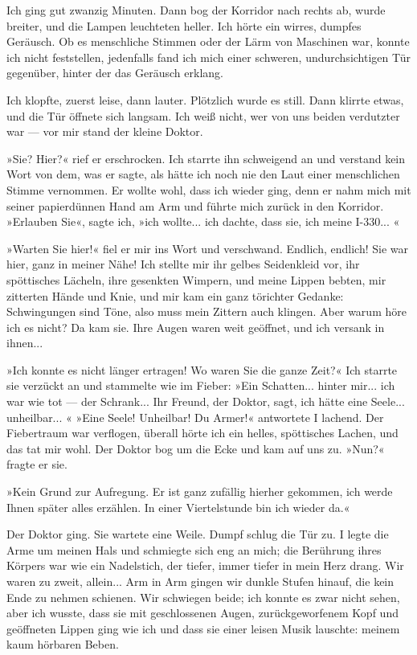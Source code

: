 Ich ging gut zwanzig Minuten. Dann bog der Korridor nach rechts ab,
wurde breiter, und die Lampen leuchteten heller. Ich hörte ein
wirres, dumpfes Geräusch. Ob es menschliche Stimmen oder der Lärm
von Maschinen war, konnte ich nicht feststellen, jedenfalls fand
ich mich einer schweren, undurchsichtigen Tür gegenüber, hinter der
das Geräusch erklang.

Ich klopfte, zuerst leise, dann lauter. Plötzlich wurde es still.
Dann klirrte etwas, und die Tür öffnete sich langsam. Ich weiß
nicht, wer von uns beiden verdutzter war — vor mir stand der kleine
Doktor.

»Sie? Hier?« rief er erschrocken. Ich starrte ihn schweigend an und
verstand kein Wort von dem, was er sagte, als hätte ich noch nie
den Laut einer menschlichen Stimme vernommen. Er wollte wohl, dass
ich wieder ging, denn er nahm mich mit seiner papierdünnen Hand am
Arm und führte mich zurück in den Korridor. »Erlauben Sie«, sagte
ich, »ich wollte... ich dachte, dass sie, ich meine I-330... «

»Warten Sie hier!« fiel er mir ins Wort und verschwand. Endlich,
endlich! Sie war hier, ganz in meiner Nähe! Ich stellte mir ihr
gelbes Seidenkleid vor, ihr spöttisches Lächeln, ihre gesenkten
Wimpern, und meine Lippen bebten, mir zitterten Hände und Knie, und
mir kam ein ganz törichter Gedanke: Schwingungen sind Töne, also
muss mein Zittern auch klingen. Aber warum höre ich es nicht? Da
kam sie. Ihre Augen waren weit geöffnet, und ich versank in
ihnen...

»Ich konnte es nicht länger ertragen! Wo waren Sie die ganze Zeit?«
Ich starrte sie verzückt an und stammelte wie im Fieber: »Ein
Schatten... hinter mir... ich war wie tot — der Schrank... Ihr
Freund, der Doktor, sagt, ich hätte eine Seele... unheilbar... «
»Eine Seele! Unheilbar! Du Armer!« antwortete I lachend. Der
Fiebertraum war verflogen, überall hörte ich ein helles,
spöttisches Lachen, und das tat mir wohl. Der Doktor bog um die
Ecke und kam auf uns zu. »Nun?« fragte er sie.

»Kein Grund zur Aufregung. Er ist ganz zufällig hierher gekommen,
ich werde Ihnen später alles erzählen. In einer Viertelstunde bin
ich wieder da.«

Der Doktor ging. Sie wartete eine Weile. Dumpf schlug die Tür zu. I
legte die Arme um meinen Hals und schmiegte sich eng an mich; die
Berührung ihres Körpers war wie ein Nadelstich, der tiefer, immer
tiefer in mein Herz drang. Wir waren zu zweit, allein... Arm in Arm
gingen wir dunkle Stufen hinauf, die kein Ende zu nehmen schienen.
Wir schwiegen beide; ich konnte es zwar nicht sehen, aber ich
wusste, dass sie mit geschlossenen Augen, zurückgeworfenem Kopf und
geöffneten Lippen ging wie ich und dass sie einer leisen Musik
lauschte: meinem kaum hörbaren Beben.


